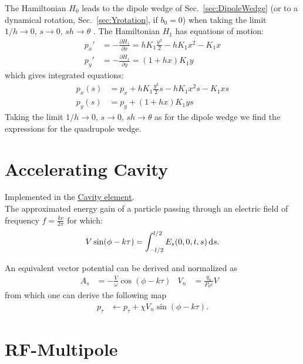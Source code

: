 The Hamiltonian $H_0$ leads to the dipole wedge of Sec.~\ref{sec:DipoleWedge} (or to a dynamical rotation, Sec.~\ref{sec:Yrotation}, if $b_0 = 0$) when taking the limit $1/h \to 0, \, s \to 0, \, s h \to \theta$ .
The Hamiltonian $H_1$ has equations of motion:
\begin{align}
p_x' &= -\frac{\partial H_1}{\partial x}
= h K_1 \frac{y^2}{2} - h K_1 x^2 - K_1 x
\label{eq:pxprime}
\\
p_y' &= -\frac{\partial H_1}{\partial y}
= (1 + h x) K_1 y
\label{eq:pyprime}
\end{align}
which gives integrated equations:
\begin{align}
p_x(s) &= p_x + h K_1 \frac{y^2}{2} s - h K_1 x^2 s - K_1 x s
\label{eq:pxs}
\\
p_y(s) &= p_y + (1 + h x) K_1 y s
\label{eq:pys}
\end{align}
Taking the limit $1/h \to 0, \, s \to 0, \, s h \to \theta$ as for the dipole wedge we find the expressions for the quadrupole wedge.





\section{Accelerating Cavity}

Implemented in the \href{https://xsuite.readthedocs.io/en/latest/apireference.html#cavity}{\underline{Cavity element}}.
~\\

The approximated energy gain of a particle passing through an electric field of frequency $f=\frac{kc}{2\pi}$ for which:
\begin{align}
V \sin(\phi - k \tau) = \int_{-l/2}^{l/2} E_s(0,0,t,s)  {\rm \,d}s.
\end{align}

An equivalent vector potential can be derived and normalized as
\begin{align}
A_s& = - \frac{V}{\omega} \cos(\phi - k \tau ) &
V_n&=  \frac{q_0}{P_0 c} V  &
\end{align}
from which one can derive the following map
\begin{align}
p_\tau & \leftarrow p_\tau + \chi V_n \sin(\phi - k \tau).
\end{align}



\section{RF-Multipole}

